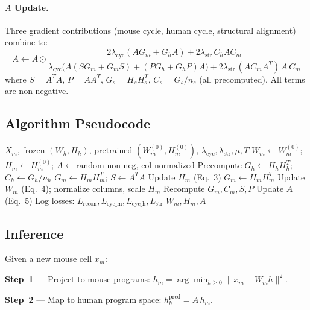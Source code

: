 \documentclass[10pt,twocolumn,letterpaper]{article}
\begin{document}
\paragraph{$A$ Update.}
Three gradient contributions (mouse cycle, human cycle, structural alignment)
combine to:
\begin{equation}
  \boxed{A \leftarrow A \odot
    \frac{2\lambda_{\text{cyc}}(AG_m + G_h A) + 2\lambda_{\text{str}}\,C_h A C_m}
         {\lambda_{\text{cyc}}\big(A(SG_m\!+\!G_m S) + (PG_h\!+\!G_h P)A\big)
          + 2\lambda_{\text{str}}\,(AC_m A^T)\,A\,C_m}}
\end{equation}
where $S = A^T A$, $P = A A^T$, $G_s = H_s H_s^T$, $C_s = G_s / n_s$
(all precomputed). All terms are non-negative.

\subsection{Algorithm Pseudocode}

\begin{algorithm}[h]
\caption{One-Sided Cycle-Consistent Adapter NMF}
\begin{algorithmic}[1]
\Require $X_m$, frozen $(W_h, H_h)$, pretrained $(W_m^{(0)}, H_m^{(0)})$,
         $\lambda_{\text{cyc}}, \lambda_{\text{str}}, \mu, T$
\State $W_m \gets W_m^{(0)}$; $H_m \gets H_m^{(0)}$;
       $A \gets \text{random non-neg, col-normalized}$
\State Precompute $G_h \gets H_h H_h^T$; $C_h \gets G_h / n_h$
  \State $G_m \gets H_m H_m^T$; $S \gets A^T A$
  \State Update $H_m$ (Eq.~3)
  \State $G_m \gets H_m H_m^T$ 
  \State Update $W_m$ (Eq.~4); normalize columns, scale $H_m$
  \State Recompute $G_m, C_m, S, P$
  \State Update $A$ (Eq.~5)
  \State Log losses: $L_{\text{recon}}, L_{\text{cyc\_m}}, L_{\text{cyc\_h}}, L_{\text{str}}$
\EndFor
\State \Return $W_m, H_m, A$
\end{algorithmic}
\end{algorithm}

\subsection{Inference}

Given a new mouse cell $x_m$:

\textbf{Step~1} --- Project to mouse programs:
$h_m = \arg\min_{h \geq 0} \|x_m - W_m h\|^2$.

\textbf{Step~2} --- Map to human program space:
$h_h^{\text{pred}} = A\,h_m$.
\end{document}
